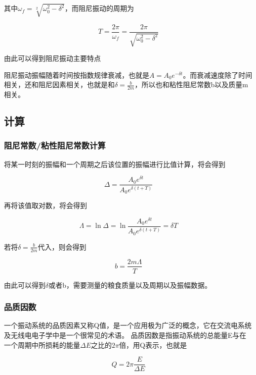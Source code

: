 \documentclass{ctexart}
\begin{document}
  其中$\omega_{f} = \sqrt[2]{\omega_{0}^{2} - \delta^{2}}$，而阻尼振动的周期为

  $$T = \frac{2\pi}{\omega_{f}} = \frac{2\pi}{\sqrt{\omega_{0}^{2} - \delta^{2}}}$$

  由此可以得到阻尼振动主要特点

  阻尼振动振幅随着时间按指数规律衰减，也就是$A=A_{0} e^{-\delta t}$。而衰减速度除了时间相关，还和阻尼因素相关，也就是和$\delta=\frac{b}{2m}$，所以也和粘性阻尼常数b以及质量m相关。

  \subsection{计算}
    \subsubsection{阻尼常数/粘性阻尼常数计算}
    将某一时刻的振幅和一个周期之后该位置的振幅进行比值计算，将会得到

    \begin{equation}
      \Delta = \frac{A_{0} e^{\delta t}}{A_{0} e^{\delta (t+T)}}
    \end{equation}

    再将该值取对数，将会得到

    \begin{equation}
      \Lambda = \ln \Delta = \ln \frac{A_{0} e^{\delta t}}{A_{0} e^{\delta (t+T)}} = \delta T
    \end{equation}

    若将$\delta = \frac{b}{2m}$代入，则会得到

    \begin{equation}
      b = \frac{2m\Lambda}{T}
    \end{equation}

    由此可以得到$\delta$或者b，需要测量的粮食质量以及周期以及振幅数据。

    \subsubsection{品质因数}
    一个振动系统的品质因素又称Q值，是一个应用极为广泛的概念，它在交流电系统及无线电电子学中是一个很常见的术语。
    品质因数是指振动系统的总能量E与在一个周期中所损耗的能量$\Delta E$之比的$2\pi$倍，用Q表示，也就是

    \begin{equation}
      Q=2\pi \frac{E}{\Delta E}
    \end{equation}
\end{document}

